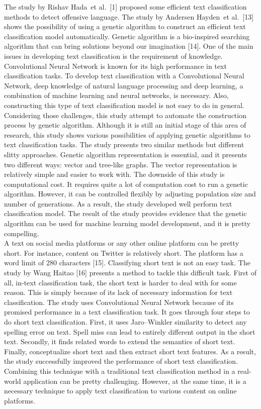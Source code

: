 \documentclass[12pt, natbib=false]{article}
\begin{document}
The study by Rishav Hada et al. [1] proposed some efficient text classification methods to detect offensive language. The study by Andersen Hayden et al. [13] shows the possibility of using a genetic algorithm to construct an efficient text classification model automatically. Genetic algorithm is a bio-inspired searching algorithm that can bring solutions beyond our imagination [14]. One of the main issues in developing text classification is the requirement of knowledge. Convolutional Neural Network is known for its high performance in text classification tasks. To develop text classification with a Convolutional Neural Network, deep knowledge of natural language processing and deep learning, a combination of machine learning and neural networks, is necessary. Also, constructing this type of text classification model is not easy to do in general. Considering those challenges, this study attempt to automate the construction process by genetic algorithm. Although it is still an initial stage of this area of research, this study shows various possibilities of applying genetic algorithms to text classification tasks. The study presents two similar methods but different slitty approaches. Genetic algorithm representation is essential, and it presents two different ways: vector and tree-like graphs. The vector representation is relatively simple and easier to work with. The downside of this study is computational cost. It requires quite a lot of computation cost to run a genetic algorithm. However, it can be controlled flexibly by adjusting population size and number of generations. As a result, the study developed well perform text classification model. The result of the study provides evidence that the genetic algorithm can be used for machine learning model development, and it is pretty compelling. \\
A text on social media platforms or any other online platform can be pretty short. For instance, content on Twitter is relatively short. The platform has a word limit of 280 characters [15]. Classifying short text is not an easy task. The study by Wang Haitao [16] presents a method to tackle this difficult task. First of all, in-text classification task, the short text is harder to deal with for some reason. This is simply because of its lack of necessary information for text classification. The study uses Convolutional Neural Network because of its promised performance in a text classification task. It goes through four steps to do short text classification. First, it uses Jaro–Winkler similarity to detect any spelling error on text. Spell miss can lead to entirely different output in the short text. Secondly, it finds related words to extend the semantics of short text. Finally, conceptualize short text and then extract short text features. As a result, the study successfully improved the performance of short text classification. Combining this technique with a traditional text classification method in a real-world application can be pretty challenging. However, at the same time, it is a necessary technique to apply text classification to various content on online platforms. \\
\end{document}
